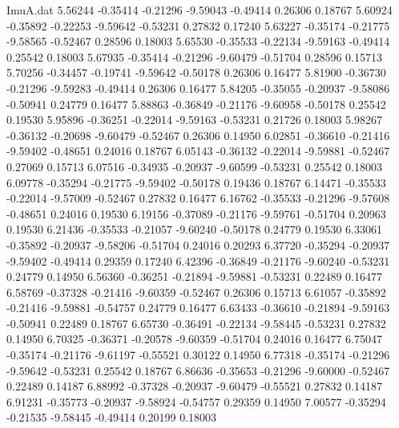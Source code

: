 \begin{filecontents}{ImuA.dat}
   5.56244   -0.35414   -0.21296   -9.59043   -0.49414    0.26306    0.18767
   5.60924   -0.35892   -0.22253   -9.59642   -0.53231    0.27832    0.17240
   5.63227   -0.35174   -0.21775   -9.58565   -0.52467    0.28596    0.18003
   5.65530   -0.35533   -0.22134   -9.59163   -0.49414    0.25542    0.18003
   5.67935   -0.35414   -0.21296   -9.60479   -0.51704    0.28596    0.15713
   5.70256   -0.34457   -0.19741   -9.59642   -0.50178    0.26306    0.16477
   5.81900   -0.36730   -0.21296   -9.59283   -0.49414    0.26306    0.16477
   5.84205   -0.35055   -0.20937   -9.58086   -0.50941    0.24779    0.16477
   5.88863   -0.36849   -0.21176   -9.60958   -0.50178    0.25542    0.19530
   5.95896   -0.36251   -0.22014   -9.59163   -0.53231    0.21726    0.18003
   5.98267   -0.36132   -0.20698   -9.60479   -0.52467    0.26306    0.14950
   6.02851   -0.36610   -0.21416   -9.59402   -0.48651    0.24016    0.18767
   6.05143   -0.36132   -0.22014   -9.59881   -0.52467    0.27069    0.15713
   6.07516   -0.34935   -0.20937   -9.60599   -0.53231    0.25542    0.18003
   6.09778   -0.35294   -0.21775   -9.59402   -0.50178    0.19436    0.18767
   6.14471   -0.35533   -0.22014   -9.57009   -0.52467    0.27832    0.16477
   6.16762   -0.35533   -0.21296   -9.57608   -0.48651    0.24016    0.19530
   6.19156   -0.37089   -0.21176   -9.59761   -0.51704    0.20963    0.19530
   6.21436   -0.35533   -0.21057   -9.60240   -0.50178    0.24779    0.19530
   6.33061   -0.35892   -0.20937   -9.58206   -0.51704    0.24016    0.20293
   6.37720   -0.35294   -0.20937   -9.59402   -0.49414    0.29359    0.17240
   6.42396   -0.36849   -0.21176   -9.60240   -0.53231    0.24779    0.14950
   6.56360   -0.36251   -0.21894   -9.59881   -0.53231    0.22489    0.16477
   6.58769   -0.37328   -0.21416   -9.60359   -0.52467    0.26306    0.15713
   6.61057   -0.35892   -0.21416   -9.59881   -0.54757    0.24779    0.16477
   6.63433   -0.36610   -0.21894   -9.59163   -0.50941    0.22489    0.18767
   6.65730   -0.36491   -0.22134   -9.58445   -0.53231    0.27832    0.14950
   6.70325   -0.36371   -0.20578   -9.60359   -0.51704    0.24016    0.16477
   6.75047   -0.35174   -0.21176   -9.61197   -0.55521    0.30122    0.14950
   6.77318   -0.35174   -0.21296   -9.59642   -0.53231    0.25542    0.18767
   6.86636   -0.35653   -0.21296   -9.60000   -0.52467    0.22489    0.14187
   6.88992   -0.37328   -0.20937   -9.60479   -0.55521    0.27832    0.14187
   6.91231   -0.35773   -0.20937   -9.58924   -0.54757    0.29359    0.14950
   7.00577   -0.35294   -0.21535   -9.58445   -0.49414    0.20199    0.18003

\end{filecontents}
